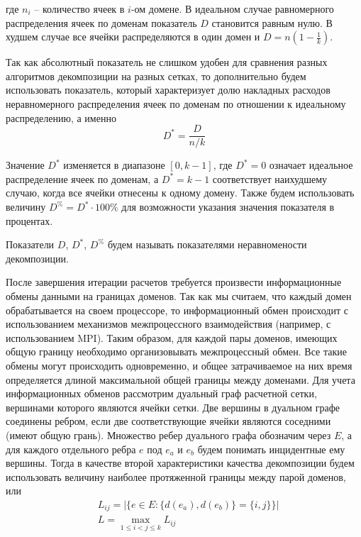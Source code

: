 где $n_i$ – количество ячеек в $i$-ом домене.
В идеальном случае равномерного распределения ячеек по доменам показатель $D$ становится равным нулю.
В худшем случае все ячейки распределяются в один домен и $D = n \left( 1 - \frac{1}{k} \right)$.

Так как абсолютный показатель не слишком удобен для сравнения разных алгоритмов декомпозиции на разных сетках, то дополнительно будем использовать показатель, который характеризует долю накладных расходов неравномерного распределения ячеек по доменам по отношении к идеальному распределению, а именно
\begin{equation}
	D^{*} = \frac{D}{n / k}
\end{equation}

Значение $D^{*}$ изменяется в диапазоне $[0, k - 1]$, где $D^{*} = 0$ означает идеальное распределение ячеек по доменам, а $D^{*} = k - 1$ соответствует наихудшему случаю, когда все ячейки отнесены к одному домену.
Также будем использовать величину $D^{\%} = D^{*} \cdot 100\%$ для возможности указания значения показателя в процентах.

\begin{definition}
Показатели $D$, $D^{*}$, $D^{\%}$ будем называть показателями неравномености декомпозиции\label{term:decomp_neravn}.
\end{definition} 

После завершения итерации расчетов требуется произвести информационные обмены данными на границах доменов.
Так как мы считаем, что каждый домен обрабатывается на своем процессоре, то информационный обмен происходит с использованием механизмов межпроцессного взаимодействия (например, с использованием MPI\label{abbr:mpi}).
Таким образом, для каждой пары доменов, имеющих общую границу необходимо организовывать межпроцессный обмен.
Все такие обмены могут происходить одновременно, и общее затрачиваемое на них время определяется длиной максимальной общей границы между доменами.
Для учета информационных обменов рассмотрим дуальный граф расчетной сетки\label{term:dual_graph}, вершинами которого являются ячейки сетки.
Две вершины в дуальном графе соединены ребром, если две соответствующие ячейки являются соседними (имеют общую грань).
Множество ребер дуального графа обозначим через $E$, а для каждого отдельного ребра $e$ под $e_a$ и $e_b$ будем понимать инцидентные ему вершины.
Тогда в качестве второй характеристики качества декомпозиции будем использовать величину наиболее протяженной границы между парой доменов, или
\begin{equation}
	\begin{aligned}
		& L_{ij} = \left| \{ e \in E: \{ d(e_a), d(e_b) \} = \{ i, j \} \} \right| \\
		& L = \max_{1 \le i < j \le k}{L_{ij}}
	\end{aligned}
\end{equation}

